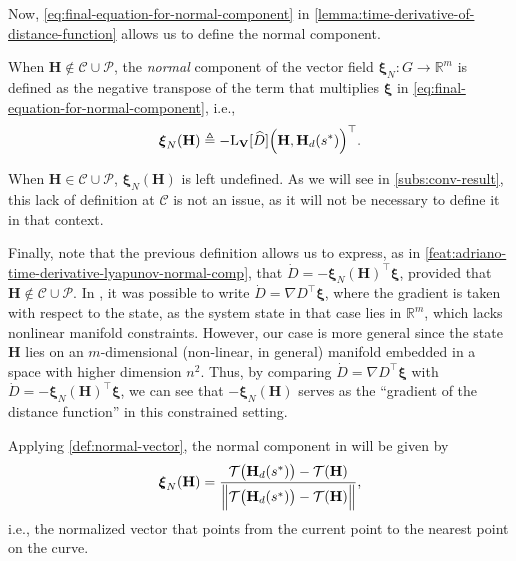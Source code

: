 Now, \eqref{eq:final-equation-for-normal-component} in \cref{lemma:time-derivative-of-distance-function} allows us to define the normal component. 
\begin{definition}  \label{def:normal-vector}
    When $\mathbf{H} \not \in \mathcal{C} \cup \mathcal{P}$, the \emph{normal} component of the vector field $\boldsymbol{\xi}_N: G\to\mathbb{R}^m$ is defined as the negative transpose of the term that multiplies $\boldsymbol{\xi}$ in \eqref{eq:final-equation-for-normal-component}, i.e., 
    \begin{align}
        \boldsymbol{\xi}_N(\mathbf{H}) \triangleq -\text{L}_{\mathbf{V}}[\widehat{D}]\Bigl(\mathbf{H}, \mathbf{H}_d(s^*)\Bigr)^{\top}.
    \end{align}
\end{definition}
When $\mathbf{H} \in \mathcal{C} \cup \mathcal{P}$, $\boldsymbol{\xi}_N(\mathbf{H})$ is left undefined. As we will see in \cref{subs:conv-result}, this lack of definition at $\mathcal{C}$ is not an issue, as it will not be necessary to define it in that context. 

Finally, note that the previous definition allows us to express, as in \cref{feat:adriano-time-derivative-lyapunov-normal-comp}, that $\dot{D} = -\boldsymbol{\xi}_N(\mathbf{H})^{\top}\boldsymbol{\xi}$, provided that $\mathbf{H} \not \in \mathcal{C} \cup \mathcal{P}$. In \citet{Rezende2022}, it was possible to write $\dot{D} = \nabla D^{\top} \boldsymbol{\xi}$, where the gradient is taken with respect to the state, as the system state in that case lies in $\mathbb{R}^m$, which lacks nonlinear manifold constraints. However, our case is more general since the state $\mathbf{H}$ lies on an $m$-dimensional (non-linear, in general) manifold embedded in a space with higher dimension $n^2$. Thus, by comparing $\dot{D} = \nabla D^{\top} \boldsymbol{\xi}$ with $\dot{D} = -\boldsymbol{\xi}_N(\mathbf{H})^{\top}\boldsymbol{\xi}$, we can see that $-\boldsymbol{\xi}_N(\mathbf{H})$ serves as the ``gradient of the distance function'' in this constrained setting.

\begin{example}\label{example:xi_N_rezende}
    Applying \cref{def:normal-vector}, the normal component in \citet{Rezende2022} will be given by
    \begin{align*}
        \boldsymbol{\xi}_{N}(\mathbf{H})= \frac{\mathcal{T}\bigl(\mathbf{H}_d(s^*)\bigr) - \mathcal{T}(\mathbf{H})}{\Bigl\|\mathcal{T}\bigl(\mathbf{H}_d(s^*)\bigr) - \mathcal{T}(\mathbf{H})\Bigr\|},  
    \end{align*}
     i.e., the normalized vector that points from the current point to the nearest point on the curve.
\end{example}
